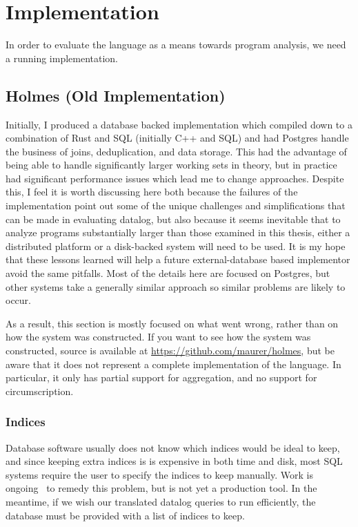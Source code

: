 \section{Implementation}
In order to evaluate the language as a means towards program analysis, we need a running implementation.
\subsection{Holmes (Old Implementation)}
Initially, I produced a database backed implementation which compiled down to a combination of Rust and SQL (initially C++ and SQL) and had Postgres handle the business of joins, deduplication, and data storage.
This had the advantage of being able to handle significantly larger working sets in theory, but in practice had significant performance issues which lead me to change approaches.
Despite this, I feel it is worth discussing here both because the failures of the implementation point out some of the unique challenges and simplifications that can be made in evaluating datalog, but also because it seems inevitable that to analyze programs substantially larger than those examined in this thesis, either a distributed platform or a disk-backed system will need to be used.
It is my hope that these lessons learned will help a future external-database based implementor avoid the same pitfalls.
Most of the details here are focused on Postgres, but other systems take a generally similar approach so similar problems are likely to occur.

As a result, this section is mostly focused on what went wrong, rather than on how the system was constructed.
If you want to see how the system was constructed, source is available at \url{https://github.com/maurer/holmes}, but be aware that it does not represent a complete implementation of the language.
In particular, it only has partial support for aggregation, and no support for circumscription.

\subsubsection{Indices}
Database software usually does not know which indices would be ideal to keep, and since keeping extra indices is is expensive in both time and disk, most SQL systems require the user to specify the indices to keep manually.
Work is ongoing~\cite{peloton} to remedy this problem, but is not yet a production tool.
In the meantime, if we wish our translated datalog queries to run efficiently, the database must be provided with a list of indices to keep.

